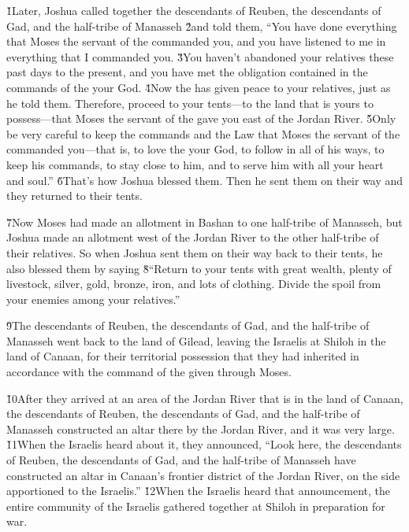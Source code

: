 \v{1}Later, Joshua called together the descendants of Reuben, the descendants of Gad, and the half-tribe of Manasseh \v{2}and told them, ``You have done everything that Moses the servant of the  commanded you, and you have listened to me in everything that I commanded you. \v{3}You haven't abandoned your relatives these past days to the present, and you have met the obligation contained in the commands of the  your God. \v{4}Now the  has given peace to your relatives, just as he told them. Therefore, proceed to your tents---to the land that is yours to possess---that Moses the servant of the  gave you east of the Jordan River. \v{5}Only be very careful to keep the commands and the Law that Moses the servant of the  commanded you---that is, to love the  your God, to follow in all of his ways, to keep his commands, to stay close to him, and to serve him with all your heart and soul.'' \v{6}That's how Joshua blessed them. Then he sent them on their way and they returned to their tents.

\v{7}Now Moses had made an allotment in Bashan to one half-tribe of Manasseh, but Joshua made an allotment west of the Jordan River to the other half-tribe of their relatives. So when Joshua sent them on their way back to their tents, he also blessed them by saying \v{8}``Return to your tents with great wealth, plenty of livestock, silver, gold, bronze, iron, and lots of clothing. Divide the spoil from your enemies among your relatives.''

\v{9}The descendants of Reuben, the descendants of Gad, and the half-tribe of Manasseh went back to the land of Gilead, leaving the Israelis at Shiloh in the land of Canaan, for their territorial possession that they had inherited in accordance with the command of the  given through Moses.

\v{10}After they arrived at an area of the Jordan River that is in the land of Canaan, the descendants of Reuben, the descendants of Gad, and the half-tribe of Manasseh constructed an altar there by the Jordan River, and it was very large. \v{11}When the Israelis heard about it, they announced, ``Look here, the descendants of Reuben, the descendants of Gad, and the half-tribe of Manasseh have constructed an altar in Canaan's frontier district of the Jordan River, on the side apportioned to the Israelis.'' \v{12}When the Israelis heard that announcement, the entire community of the Israelis gathered together at Shiloh in preparation for war.

